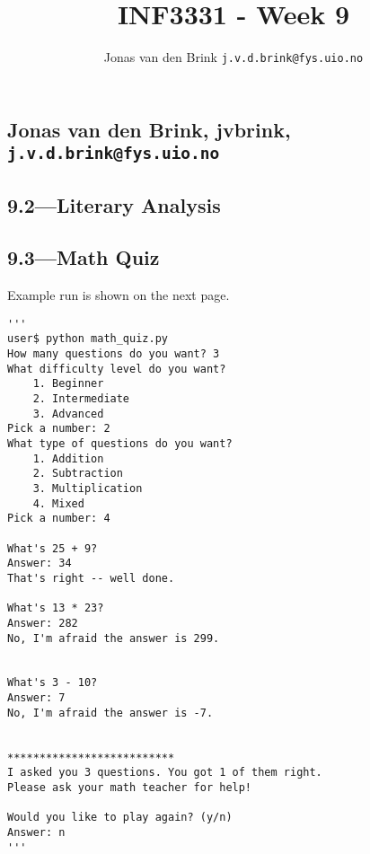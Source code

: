 \documentclass[a4paper, 11pt, titlepage, english]{article}
\title{INF3331 - Week 9}
\author{Jonas van den Brink \texttt{j.v.d.brink@fys.uio.no}}
\begin{document}
\pagestyle{empty}
\subsection*{Jonas van den Brink, jvbrink, \texttt{j.v.d.brink@fys.uio.no}}
\subsection*{9.2---Literary Analysis}



\clearpage

\subsection*{9.3---Math Quiz}


Example run is shown on the next page.

\clearpage

\begin{lstlisting}
'''
user$ python math_quiz.py 
How many questions do you want? 3
What difficulty level do you want?
    1. Beginner
    2. Intermediate
    3. Advanced
Pick a number: 2
What type of questions do you want?
    1. Addition
    2. Subtraction
    3. Multiplication
    4. Mixed
Pick a number: 4

What's 25 + 9?
Answer: 34
That's right -- well done.

What's 13 * 23?
Answer: 282
No, I'm afraid the answer is 299.


What's 3 - 10?
Answer: 7
No, I'm afraid the answer is -7.


**************************
I asked you 3 questions. You got 1 of them right.
Please ask your math teacher for help!

Would you like to play again? (y/n)
Answer: n
'''
\end{lstlisting}
\end{document}
